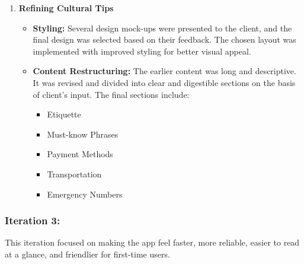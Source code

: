 \begin{enumerate}
    \item \textbf{Refining Cultural Tips}
    \begin{itemize}
        \item \textbf{Styling:} Several design mock-ups were presented to the client, and the final design was selected based on their feedback. The chosen layout was implemented with improved styling for better visual appeal.
        \item \textbf{Content Restructuring:} The earlier content was long and descriptive. It was revised and divided into clear and digestible sections on the basis of client's input. The final sections include:
        \begin{itemize}
            \item Etiquette
            \item Must-know Phrases
            \item Payment Methods
            \item Transportation
            \item Emergency Numbers
        \end{itemize}
    \end{itemize}
\end{enumerate}

\subsubsection{Iteration 3:}
This iteration focused on making the app feel faster, more reliable, easier to read at a glance, and friendlier for first-time users.

